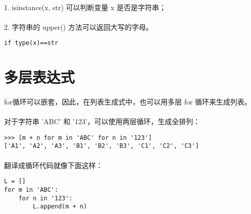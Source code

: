 \documentclass{article}
\begin{document}
\begin{CJK}{UTF8}{gbsn}
\paragraph{}
1. isinstance(x, str) 可以判断变量 x 是否是字符串；
\paragraph{}
2. 字符串的 upper() 方法可以返回大写的字母。
\begin{verbatim}
if type(x)==str
\end{verbatim}
\section{多层表达式}
\paragraph{}
for循环可以嵌套，因此，在列表生成式中，也可以用多层 for 循环来生成列表。
\paragraph{}
对于字符串 'ABC' 和 '123'，可以使用两层循环，生成全排列：
\begin{verbatim}
>>> [m + n for m in 'ABC' for n in '123']
['A1', 'A2', 'A3', 'B1', 'B2', 'B3', 'C1', 'C2', 'C3']
\end{verbatim}
\paragraph{}
翻译成循环代码就像下面这样：
\begin{verbatim}
L = []
for m in 'ABC':
    for n in '123':
        L.append(m + n)
\end{verbatim}
\end{CJK}
\end{document}
